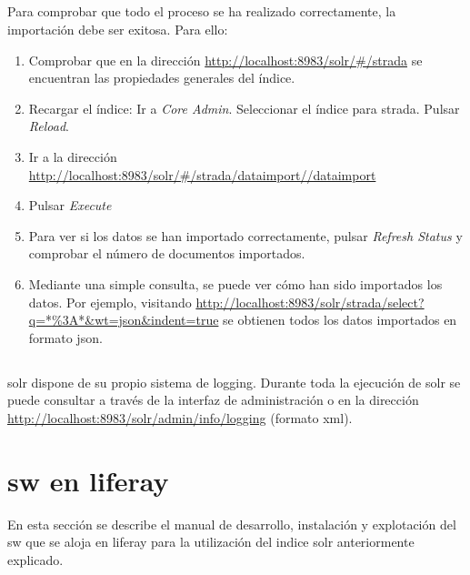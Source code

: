 \subsection{}
Para comprobar que todo el proceso se ha realizado correctamente, la importación debe ser exitosa. Para ello:
\begin{enumerate}
	\item Comprobar que en la dirección \url{http://localhost:8983/solr/#/strada} se encuentran las propiedades generales del índice.
	\item Recargar el índice:
		\subitem Ir a \textit{Core Admin}.
		\subitem Seleccionar el índice para \gls{strada}.
		\subitem Pulsar \textit{Reload}.
	\item Ir a la dirección \url{http://localhost:8983/solr/#/strada/dataimport//dataimport}
	\item Pulsar \textit{Execute}
	\item Para ver si los datos se han importado correctamente, pulsar \textit{Refresh Status} y comprobar el número de documentos importados.
	\item Mediante una simple consulta, se puede ver cómo han sido importados los datos. Por ejemplo, visitando \url{http://localhost:8983/solr/strada/select?q=*\%3A*&wt=json&indent=true} se obtienen todos los datos importados en formato \gls{json}.
\end{enumerate}

\subsection{}
\Gls{solr} dispone de su propio sistema de \gls{logging}. Durante toda la ejecución de \gls{solr} se puede consultar a través de la interfaz de administración o en la dirección \url{http://localhost:8983/solr/admin/info/logging} (formato \gls{xml}).

\section{\Gls{sw} en \gls{liferay}}
\label{section:manualsw}
En esta sección se describe el manual de desarrollo, instalación y explotación del \gls{sw} que se aloja en \gls{liferay} para la utilización del indice \gls{solr} anteriormente 
explicado.

